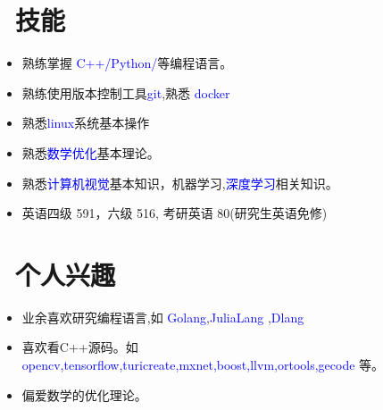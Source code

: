 \documentclass{resume}
\begin{document}
 \section{\textcolor{blue}\faCogs\ 技能}
 \begin{itemize}[parsep=0.5ex]
   \item 熟练掌握 \textcolor{blue}{C++/Python/}等编程语言。
   \item 熟练使用版本控制工具\textcolor{blue} {git},熟悉 \textcolor{blue}{docker}  
   \item 熟悉\textcolor{blue}{linux}系统基本操作 
   \item 熟悉\textcolor{blue}{数学优化}基本理论。
   \item 熟悉\textcolor{blue}{计算机视觉}基本知识，机器学习,\textcolor{blue}{深度学习}相关知识。
   \item 英语四级 591，六级 516, 考研英语 80(研究生英语免修)
\end{itemize}

\section{\textcolor{red}\faHeartO\ 个人兴趣}
\begin{itemize}[parsep=0.5ex]
\item 业余喜欢研究编程语言,如 \textcolor{blue}{Golang},\textcolor{blue}{JuliaLang} ,\textcolor{blue}{Dlang}
\item 喜欢看C++源码。如 \textcolor{blue}{opencv,tensorflow,turicreate,mxnet,boost,llvm,ortools,gecode} 等。
\item 偏爱数学的优化理论。   
\end{itemize}
\end{document}
